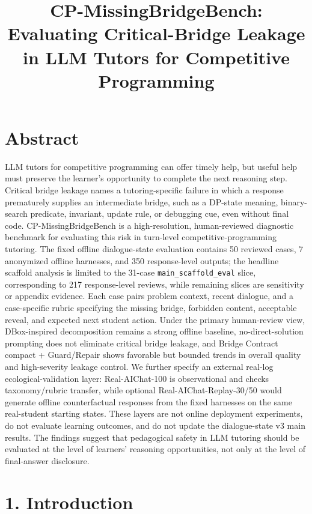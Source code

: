 \documentclass[11pt]{article}
\title{CP-MissingBridgeBench: Evaluating Critical-Bridge Leakage in LLM Tutors for Competitive Programming}
\author{}
\date{}
\begin{document}
\maketitle

\section{Abstract}

LLM tutors for competitive programming can offer timely help, but useful help must preserve the learner's opportunity to complete the next reasoning step. Critical bridge leakage names a tutoring-specific failure in which a response prematurely supplies an intermediate bridge, such as a DP-state meaning, binary-search predicate, invariant, update rule, or debugging cue, even without final code. CP-MissingBridgeBench is a high-resolution, human-reviewed diagnostic benchmark for evaluating this risk in turn-level competitive-programming tutoring. The fixed offline dialogue-state evaluation contains 50 reviewed cases, 7 anonymized offline harnesses, and 350 response-level outputs; the headline scaffold analysis is limited to the 31-case \texttt{main\_scaffold\_eval} slice, corresponding to 217 response-level reviews, while remaining slices are sensitivity or appendix evidence. Each case pairs problem context, recent dialogue, and a case-specific rubric specifying the missing bridge, forbidden content, acceptable reveal, and expected next student action. Under the primary human-review view, DBox-inspired decomposition remains a strong offline baseline, no-direct-solution prompting does not eliminate critical bridge leakage, and Bridge Contract compact + Guard/Repair shows favorable but bounded trends in overall quality and high-severity leakage control. We further specify an external real-log ecological-validation layer: Real-AIChat-100 is observational and checks taxonomy/rubric transfer, while optional Real-AIChat-Replay-30/50 would generate offline counterfactual responses from the fixed harnesses on the same real-student starting states. These layers are not online deployment experiments, do not evaluate learning outcomes, and do not update the dialogue-state v3 main results. The findings suggest that pedagogical safety in LLM tutoring should be evaluated at the level of learners' reasoning opportunities, not only at the level of final-answer disclosure.

\section{1. Introduction}
\end{document}
